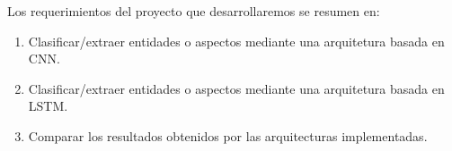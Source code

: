 %	
%	
%	
%				
%	
%	
%	

	Los requerimientos del proyecto que desarrollaremos se resumen en:
	
	\begin{enumerate}
		\item Clasificar/extraer entidades o aspectos mediante una arquitetura basada en CNN.
		\item Clasificar/extraer entidades o aspectos mediante una arquitetura basada en LSTM.
		\item Comparar los resultados obtenidos por las arquitecturas implementadas.
	\end{enumerate}

		

	
